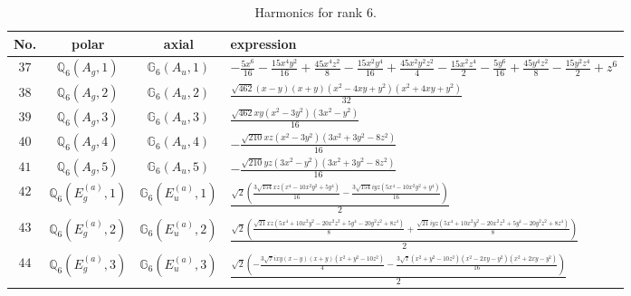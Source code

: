 \documentclass[fleqn,8pt,landscape]{jsarticle}
\begin{document}
\begin{table}[ht!]
\begin{center}
\caption{Harmonics for rank 6.}
\renewcommand{\arraystretch}{1.3}
\begin{tabular}{cccl} \hline \hline
No. & polar & axial & expression \\ \hline
$ 37 $ & $ \mathbb{Q}_{6}(A_{g},1) $ & $ \mathbb{G}_{6}(A_{u},1) $ & $ - \frac{5 x^{6}}{16} - \frac{15 x^{4} y^{2}}{16} + \frac{45 x^{4} z^{2}}{8} - \frac{15 x^{2} y^{4}}{16} + \frac{45 x^{2} y^{2} z^{2}}{4} - \frac{15 x^{2} z^{4}}{2} - \frac{5 y^{6}}{16} + \frac{45 y^{4} z^{2}}{8} - \frac{15 y^{2} z^{4}}{2} + z^{6} $ \\
$ 38 $ & $ \mathbb{Q}_{6}(A_{g},2) $ & $ \mathbb{G}_{6}(A_{u},2) $ & $ \frac{\sqrt{462} \left(x - y\right) \left(x + y\right) \left(x^{2} - 4 x y + y^{2}\right) \left(x^{2} + 4 x y + y^{2}\right)}{32} $ \\
$ 39 $ & $ \mathbb{Q}_{6}(A_{g},3) $ & $ \mathbb{G}_{6}(A_{u},3) $ & $ \frac{\sqrt{462} x y \left(x^{2} - 3 y^{2}\right) \left(3 x^{2} - y^{2}\right)}{16} $ \\
$ 40 $ & $ \mathbb{Q}_{6}(A_{g},4) $ & $ \mathbb{G}_{6}(A_{u},4) $ & $ - \frac{\sqrt{210} x z \left(x^{2} - 3 y^{2}\right) \left(3 x^{2} + 3 y^{2} - 8 z^{2}\right)}{16} $ \\
$ 41 $ & $ \mathbb{Q}_{6}(A_{g},5) $ & $ \mathbb{G}_{6}(A_{u},5) $ & $ - \frac{\sqrt{210} y z \left(3 x^{2} - y^{2}\right) \left(3 x^{2} + 3 y^{2} - 8 z^{2}\right)}{16} $ \\
$ 42 $ & $ \mathbb{Q}_{6}(E_{g}^{(a)},1) $ & $ \mathbb{G}_{6}(E_{u}^{(a)},1) $ & $ \frac{\sqrt{2} \left(\frac{3 \sqrt{154} x z \left(x^{4} - 10 x^{2} y^{2} + 5 y^{4}\right)}{16} - \frac{3 \sqrt{154} i y z \left(5 x^{4} - 10 x^{2} y^{2} + y^{4}\right)}{16}\right)}{2} $ \\
$ 43 $ & $ \mathbb{Q}_{6}(E_{g}^{(a)},2) $ & $ \mathbb{G}_{6}(E_{u}^{(a)},2) $ & $ \frac{\sqrt{2} \left(\frac{\sqrt{21} x z \left(5 x^{4} + 10 x^{2} y^{2} - 20 x^{2} z^{2} + 5 y^{4} - 20 y^{2} z^{2} + 8 z^{4}\right)}{8} + \frac{\sqrt{21} i y z \left(5 x^{4} + 10 x^{2} y^{2} - 20 x^{2} z^{2} + 5 y^{4} - 20 y^{2} z^{2} + 8 z^{4}\right)}{8}\right)}{2} $ \\
$ 44 $ & $ \mathbb{Q}_{6}(E_{g}^{(a)},3) $ & $ \mathbb{G}_{6}(E_{u}^{(a)},3) $ & $ \frac{\sqrt{2} \left(- \frac{3 \sqrt{7} i x y \left(x - y\right) \left(x + y\right) \left(x^{2} + y^{2} - 10 z^{2}\right)}{4} - \frac{3 \sqrt{7} \left(x^{2} + y^{2} - 10 z^{2}\right) \left(x^{2} - 2 x y - y^{2}\right) \left(x^{2} + 2 x y - y^{2}\right)}{16}\right)}{2} $ \\

\end{tabular}
\end{center}
\end{table}
\end{document}
